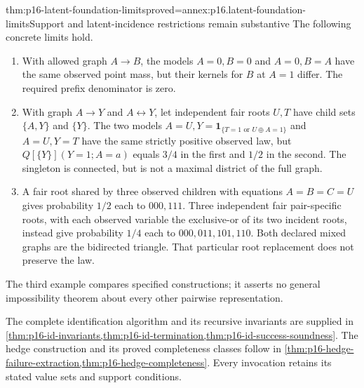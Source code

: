 \begin{hbtheorem}{thm:p16-latent-foundation-limits}{proved=annex:p16.latent-foundation-limits}{Support and latent-incidence restrictions remain substantive}
The following concrete limits hold.
\begin{enumerate}
\item With allowed graph \(A\to B\), the models \(A=0,B=0\)
      and \(A=0,B=A\) have the same observed point mass, but
      their kernels for \(B\) at \(A=1\) differ. The required
      prefix denominator is zero.
\item With graph \(A\to Y\) and \(A\leftrightarrow Y\),
      let independent fair roots \(U,T\) have child sets
      \(\{A,Y\}\) and \(\{Y\}\). The two models
      \(A=U,Y=\mathbf1_{\{T=1\text{ or }U\oplus A=1\}}\)
      and \(A=U,Y=T\) have the same strictly positive observed
      law, but \(Q[\{Y\}](Y=1;A=a)\) equals \(3/4\) in
      the first and \(1/2\) in the second. The singleton is
      connected, but is not a maximal district of the full graph.
\item A fair root shared by three observed children with equations
      \(A=B=C=U\) gives probability \(1/2\) each to
      \(000,111\). Three independent fair pair-specific roots,
      with each observed variable the exclusive-or of its two incident
      roots, instead give probability \(1/4\) each to
      \(000,011,101,110\). Both declared mixed graphs are the
      bidirected triangle. That particular root replacement does
      not preserve the law.
\end{enumerate}
The third example compares specified constructions; it asserts no
general impossibility theorem about every other pairwise representation.
\end{hbtheorem}

The complete identification algorithm and its recursive invariants are
supplied in \cref{thm:p16-id-invariants,thm:p16-id-termination,thm:p16-id-success-soundness}. The hedge construction and its proved
completeness classes follow in
\cref{thm:p16-hedge-failure-extraction,thm:p16-hedge-completeness}.
Every invocation retains its stated value sets and support conditions.
